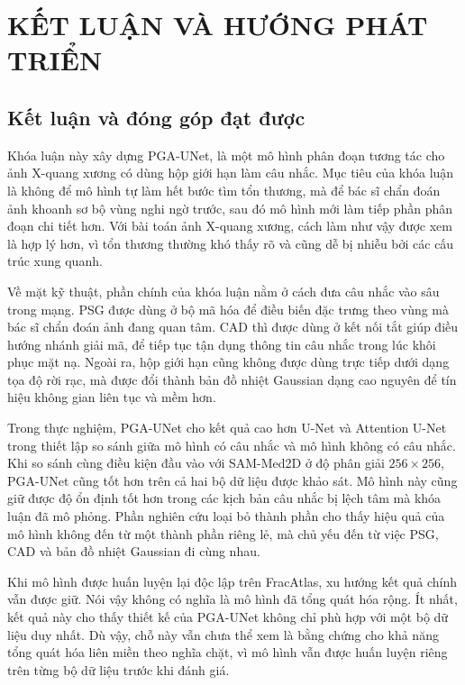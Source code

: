 \chapter{KẾT LUẬN VÀ HƯỚNG PHÁT TRIỂN}
\label{Chapter5}

\section{Kết luận và đóng góp đạt được}
\label{sec:ket_luan}

Khóa luận này xây dựng PGA-UNet, là một mô hình phân đoạn tương tác cho ảnh X-quang xương có dùng hộp giới hạn làm câu nhắc. Mục tiêu của khóa luận là không để mô hình tự làm hết bước tìm tổn thương, mà để bác sĩ chẩn đoán ảnh khoanh sơ bộ vùng nghi ngờ trước, sau đó mô hình mới làm tiếp phần phân đoạn chi tiết hơn. Với bài toán ảnh X-quang xương, cách làm như vậy được xem là hợp lý hơn, vì tổn thương thường khó thấy rõ và cũng dễ bị nhiễu bởi các cấu trúc xung quanh.

Về mặt kỹ thuật, phần chính của khóa luận nằm ở cách đưa câu nhắc vào sâu trong mạng. PSG được dùng ở bộ mã hóa để điều biến đặc trưng theo vùng mà bác sĩ chẩn đoán ảnh đang quan tâm. CAD thì được dùng ở kết nối tắt giúp điều hướng nhánh giải mã, để tiếp tục tận dụng thông tin câu nhắc trong lúc khôi phục mặt nạ. Ngoài ra, hộp giới hạn cũng không được dùng trực tiếp dưới dạng tọa độ rời rạc, mà được đổi thành bản đồ nhiệt Gaussian dạng cao nguyên để tín hiệu không gian liên tục và mềm hơn.

Trong thực nghiệm, PGA-UNet cho kết quả cao hơn U-Net và Attention U-Net trong thiết lập so sánh giữa mô hình có câu nhắc và mô hình không có câu nhắc. Khi so sánh cùng điều kiện đầu vào với SAM-Med2D ở độ phân giải $256\times256$, PGA-UNet cũng tốt hơn trên cả hai bộ dữ liệu được khảo sát. Mô hình này cũng giữ được độ ổn định tốt hơn trong các kịch bản câu nhắc bị lệch tâm mà khóa luận đã mô phỏng. Phần nghiên cứu loại bỏ thành phần cho thấy hiệu quả của mô hình không đến từ một thành phần riêng lẻ, mà chủ yếu đến từ việc PSG, CAD và bản đồ nhiệt Gaussian đi cùng nhau.

Khi mô hình được huấn luyện lại độc lập trên FracAtlas, xu hướng kết quả chính vẫn được giữ. Nói vậy không có nghĩa là mô hình đã tổng quát hóa rộng. Ít nhất, kết quả này cho thấy thiết kế của PGA-UNet không chỉ phù hợp với một bộ dữ liệu duy nhất. Dù vậy, chỗ này vẫn chưa thể xem là bằng chứng cho khả năng tổng quát hóa liên miền theo nghĩa chặt, vì mô hình vẫn được huấn luyện riêng trên từng bộ dữ liệu trước khi đánh giá.

